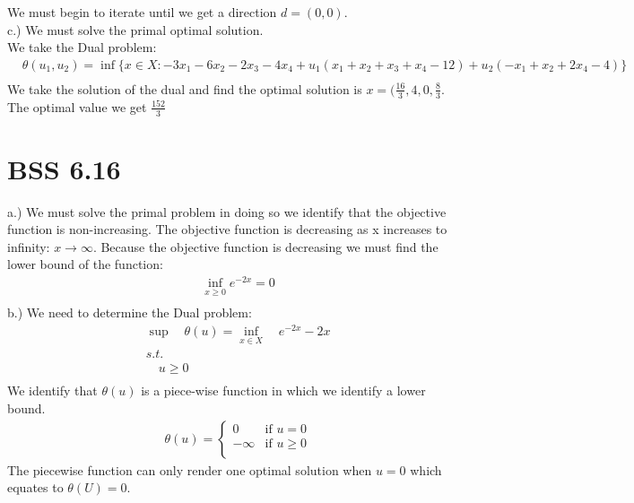 \documentclass[12pt]{article}
\begin{document}
    We must begin to iterate until we get a direction $d = (0,0)$.\\
    c.) We must solve the primal optimal solution. \\
    We take the Dual problem:\\
        \begin{align*}
            &\theta(u_1,u_2) = \inf \{x \in X:  -3x_1 - 6x_2 - 2x_3 - 4x_4 + u_1(x_1 + x_2 + x_3 +x_4 -12) + u_2(-x_1 + x_2 + 2x_4 - 4) \}\\
        \end{align*}
    We take the solution of the dual and find the optimal solution is $x = (\frac{16}{3}, 4, 0, \frac{8}{3}$. The optimal value we get $\frac{152}{3}$
\section{BSS 6.16}
    a.) We must solve the primal problem in doing so we identify that the objective function is non-increasing. The objective function is decreasing as x increases to infinity: $x \rightarrow \infty$. Because the objective function is decreasing we must find the lower bound of the function:\\
        \begin{align*}
            &\inf_{x\geq0} e^{-2x} = 0\\
        \end{align*}
    b.) We need to determine the Dual problem:\\
        \begin{align*}
            &\sup \quad \theta (u) = \inf_{x \in X} \quad e^{-2x} -2x \\
            &s.t.\\
            &\quad u\geq 0\\
        \end{align*}
    We identify that $\theta (u) $ is a piece-wise function in which we identify a lower bound. \\
        \begin{align*}
            &\theta(u) = 
                \begin{cases} 
                    0 & \text{if } u = 0\\
                    -\infty & \text{if } u \geq 0 \\
                \end{cases}
        \end{align*}
    The piecewise function can only render one optimal solution when $u=0$ which equates to $\theta (U) = 0 $. 
\end{document}
